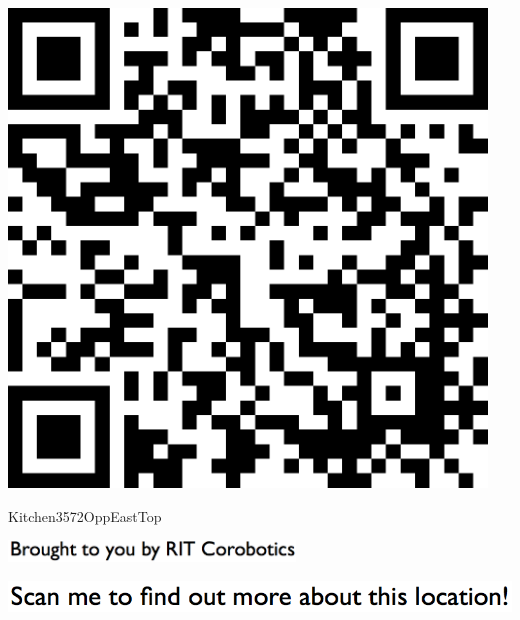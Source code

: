 \documentclass[letterpaper]{article}
\begin{document}
 \begingroup 
 \centerline{\includegraphics[scale=1,width=5in,height=5in]{Kitchen3572OppEastTop.png}} 
 \endgroup 
 \vspace*{\fill} 

 \hfill{\small Kitchen3572OppEastTop} 

  \vspace{0.7in} 
 
 \centerline{\includegraphics[scale=1,width=3in]{text-bottom.png}} 
 
 \pagebreak 
{} 
 \vspace*{\fill} 
 
  \centerline{\includegraphics[scale=1,width=6in]{text-top.png}} 
 
 \vspace{0.5in} 
 
\end{document}
